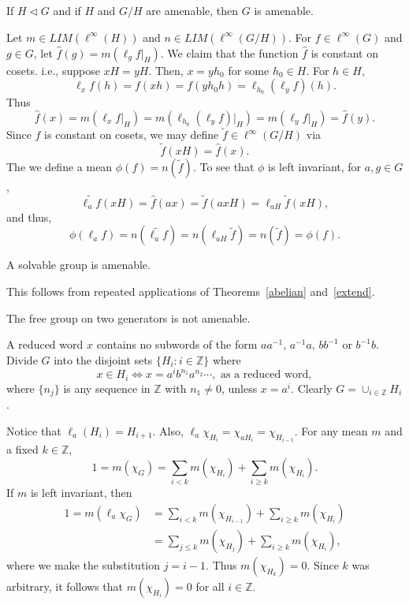 \documentclass[12pt]{report}
\begin{document}
\begin{theorem}\label{extend}
If $H\lhd G$ and if $H$ and $G/H$ are amenable, then $G$ is amenable.
\end{theorem}
\proof
Let $m\in LIM(\ell^\infty(H))$ and $n\in LIM(\ell^\infty(G/H))$.
For $f\in \ell^\infty(G)$ and $g\in G$, let $\hat{f}(g) = m(\ell_g f|_H)$.
We claim that the function $\hat{f}$ is constant on cosets.  i.e.,
suppose $xH = yH$.
Then, $x = yh_0$ for some $h_0\in H$.  For $h\in H$,
\[
\ell_x f(h) = f(xh) = f(yh_0 h) = \ell_{h_0}(\ell_y f)(h).
\]
Thus
\[
\hat{f}(x) = m(\ell_x f|_H) = m(\ell_{h_0}(\ell_y f)|_H) = m(\ell_y f|_H) = \hat{f}(y).
\]
Since $\hat{f}$ is constant on cosets, we may define $\tilde{f}\in\ell^\infty(G/H)$ via
\[
\tilde{f}(xH) = \hat{f}(x).
\]
The we define a mean $\phi(f) = n(\tilde{f})$.  To see that $\phi$ is left invariant, for $a,g\in G$,
\[
\widetilde{\ell_a f}(xH) = \hat{f}(ax) = \tilde{f}(axH) = \ell_{aH}\tilde{f}(xH),
\]
and thus,
\[
\phi(\ell_a f) = n(\widetilde{\ell_a f}) = n(\ell_{aH}\tilde{f}) = n(\tilde{f}) = \phi(f).
\]
\done

\begin{proposition}
A solvable group is amenable.
\end{proposition}
\proof
This follows from repeated applications of Theorems~\ref{abelian} and~\ref{extend}.
\done

\begin{example}
The free group on two generators is not amenable.
\end{example}
\proof
A reduced word $x$ contains no subwords of the form $aa^{-1}$, $a^{-1}a$, $bb^{-1}$ or $b^{-1}b$.
Divide $G$ into the disjoint sets $\{H_i:i\in\mathbb{Z}\}$ where
\[
x\in H_i \Leftrightarrow x=a^{i}b^{n_1}a^{n_2}\cdots, \text{ as a reduced word},
\]
where $\{n_j\}$ is any sequence in $\mathbb{Z}$ with $n_1\neq 0$, unless $x=a^i$.  Clearly
$G=\cup_{i\in\mathbb{Z}} H_i$.

Notice that $\ell_a (H_i) = H_{i+1}$.  Also, $\ell_a \chi_{H_i} = \chi_{aH_i} = \chi_{H_{i-1}}$.
For any mean $m$ and a fixed $k\in\mathbb{Z}$,
\[
1=m(\chi_G) = \sum_{i<k}m(\chi_{H_i}) + \sum_{i\geq k}m(\chi_{H_i}).
\]
If $m$ is left invariant, then
\begin{align*}
1=m(\ell_a \chi_G) &= \sum_{i<k}m(\chi_{H_{i-1}}) + \sum_{i\geq k}m(\chi_{H_i}) \\
&= \sum_{j\leq k}m(\chi_{H_{j}}) + \sum_{i\geq k}m(\chi_{H_i}),
\end{align*}
where we make the substitution $j=i-1$.  Thus $m(\chi_{H_k}) = 0$.  Since $k$ was arbitrary, it
follows that $m(\chi_{H_i})=0$ for all $i\in\mathbb{Z}$.
\end{document}
